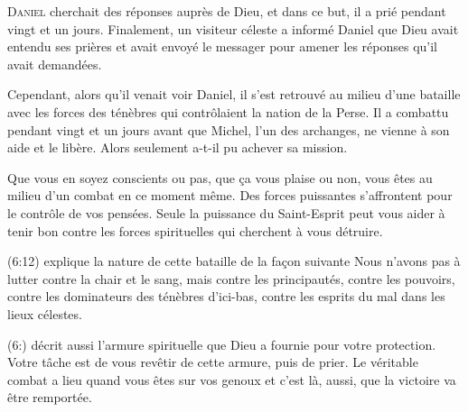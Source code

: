 \dvrule







\lettrine{D}{aniel} cherchait des réponses auprès de Dieu,
 et dans ce but, il a prié pendant vingt et un jours.
 Finalement, un visiteur céleste a informé Daniel que Dieu avait entendu
 ses prières et avait envoyé le messager pour amener les réponses
 qu'il avait demandées. 

Cependant, alors qu'il venait voir Daniel, il s'est retrouvé au milieu
 d'une bataille avec les forces des ténèbres qui contrôlaient
 la nation de la Perse. Il a combattu pendant vingt et un jours
 avant que Michel, l'un des archanges, ne vienne à son aide et le libère.
 Alors seulement a-t-il pu achever sa mission. 


Que vous en soyez conscients ou pas, que \c{c}a vous plaise ou non,
 vous êtes au milieu d'un combat en ce moment même.
 Des forces puissantes s'affrontent pour le contrôle de vos pensées.
 Seule la puissance du Saint-Esprit peut vous aider à tenir bon contre
 les forces spirituelles qui cherchent à vous détruire. 

(6:12) explique la nature de cette bataille
 de la fa\c{c}on suivante\frcolon{} \Og Nous n'avons pas à lutter contre la chair
 et le sang, mais contre les principautés, contre les pouvoirs,
 contre les dominateurs des ténèbres d'ici-bas,
 contre les esprits du mal dans les lieux célestes. \Fg{}

(6:) décrit aussi l'armure spirituelle que Dieu
 a fournie pour votre protection. Votre tâche est de vous revêtir
 de cette armure, puis de prier. Le véritable combat a lieu
 quand vous êtes sur vos genoux et c'est là, aussi,
 que la victoire va être remportée. 

